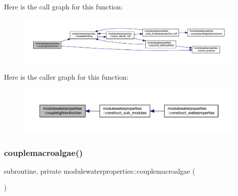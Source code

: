 Here is the call graph for this function\+:\nopagebreak
\begin{figure}[H]
\begin{center}
\leavevmode
\includegraphics[width=350pt]{namespacemodulewaterproperties_a26a4b3541362ed971440672979e6fedb_cgraph}
\end{center}
\end{figure}
Here is the caller graph for this function\+:\nopagebreak
\begin{figure}[H]
\begin{center}
\leavevmode
\includegraphics[width=350pt]{namespacemodulewaterproperties_a26a4b3541362ed971440672979e6fedb_icgraph}
\end{center}
\end{figure}
\mbox{\label{namespacemodulewaterproperties_a2eeb2f2e0e29e2293f16af83dcbe02bb}} 
\subsubsection{\texorpdfstring{couplemacroalgae()}{couplemacroalgae()}}
{\footnotesize\ttfamily subroutine, private modulewaterproperties\+::couplemacroalgae (\begin{DoxyParamCaption}{ }\end{DoxyParamCaption})\hspace{0.3cm}{\ttfamily [private]}}

